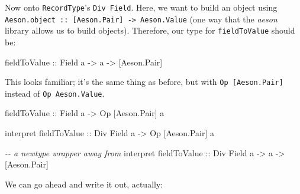 \documentclass[]{article}
\newenvironment{Shaded}{}{}
\newcommand{\CommentTok}[1]{\textcolor[rgb]{0.38,0.63,0.69}{\textit{#1}}}
\newcommand{\DataTypeTok}[1]{\textcolor[rgb]{0.56,0.13,0.00}{#1}}
\newcommand{\NormalTok}[1]{#1}
\newcommand{\OperatorTok}[1]{\textcolor[rgb]{0.40,0.40,0.40}{#1}}
\newcommand{\OtherTok}[1]{\textcolor[rgb]{0.00,0.44,0.13}{#1}}
\begin{document}
Now onto \texttt{RecordType}'s \texttt{Div\ Field}. Here, we want to build an
object using
\texttt{Aeson.object\ ::\ {[}Aeson.Pair{]}\ -\textgreater{}\ Aeson.Value} (one
way that the \emph{aeson} library allows us to build objects). Therefore, our
type for \texttt{fieldToValue} should be:

\begin{Shaded}
\begin{Highlighting}[]
\OtherTok{fieldToValue ::} \DataTypeTok{Field}\NormalTok{ a }\OtherTok{{-}\textgreater{}}\NormalTok{ a }\OtherTok{{-}\textgreater{}}\NormalTok{ [}\DataTypeTok{Aeson.Pair}\NormalTok{]}
\end{Highlighting}
\end{Shaded}

This looks familiar; it's the same thing as before, but with
\texttt{Op\ {[}Aeson.Pair{]}} instead of \texttt{Op\ Aeson.Value}.

\begin{Shaded}
\begin{Highlighting}[]
\OtherTok{fieldToValue ::} \DataTypeTok{Field}\NormalTok{ a }\OtherTok{{-}\textgreater{}} \DataTypeTok{Op}\NormalTok{ [}\DataTypeTok{Aeson.Pair}\NormalTok{] a}

\NormalTok{interpret}\OtherTok{ fieldToValue ::} \DataTypeTok{Div} \DataTypeTok{Field}\NormalTok{ a }\OtherTok{{-}\textgreater{}} \DataTypeTok{Op}\NormalTok{ [}\DataTypeTok{Aeson.Pair}\NormalTok{] a}

\CommentTok{{-}{-} a newtype wrapper away from}
\NormalTok{interpret}\OtherTok{ fieldToValue ::} \DataTypeTok{Div} \DataTypeTok{Field}\NormalTok{ a }\OtherTok{{-}\textgreater{}}\NormalTok{ a }\OtherTok{{-}\textgreater{}}\NormalTok{ [}\DataTypeTok{Aeson.Pair}\NormalTok{]}
\end{Highlighting}
\end{Shaded}

We can go ahead and write it out, actually:

\begin{Shaded}
\end{Shaded}
\end{document}
